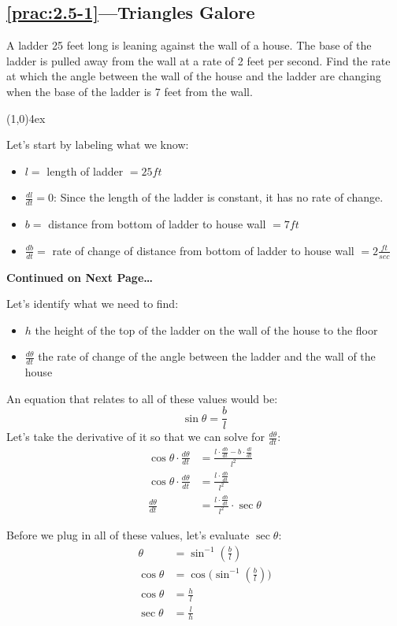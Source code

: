 \documentclass{MathNotes}
\newcommand{\continued}{
	\mbox{}
	\vfill
	\textbf{Continued on Next Page\ldots}\newpage
}
\newcommand{\br}{
	\begin{center}
		\line(1,0){4ex}
	\end{center}}
\begin{document}
\subsection*{\ref{prac:2.5-1}---Triangles Galore}\label{ans:2.5-1}
A ladder 25 feet long is leaning against the wall of a house. The base
of the ladder is pulled away from the wall at a rate of 2 feet per
second. Find the rate at which the angle between the wall of the house and the
ladder are changing when the base of the ladder is 7 feet from the wall.
\br
Let's start by labeling what we know:
\begin{multicols}{2}
	\begin{itemize}
		\item $l=$ length of ladder $=25ft$
		\item $\frac{dl}{dt}=0$: Since the length of the ladder is
		      constant, it has no rate of change.
		\item $b=$ distance from bottom of ladder to house wall $=7ft$
		\item $\frac{db}{dt}=$ rate of change of distance from bottom of ladder
		      to house wall $=2\frac{ft}{sec}$
	\end{itemize}
\end{multicols}
\continued
Let's identify what we need to find:
\begin{itemize}
	\item $h$ the height of the top of the ladder on the wall of the house
	      to the floor
	\item $\frac{d\theta}{dt}$ the rate of change of the angle between the
	      ladder and the wall of the house
\end{itemize}

An equation that relates to all of these values would be:
$$\sin\theta=\frac{b}{l}$$
Let's take the derivative of it so that we can solve for $\frac{d\theta}{dt}$:
\begin{align*}
	\cos\theta\cdot\frac{d\theta}{dt} & =\frac{l\cdot\frac{db}{dt}-b\cdot\frac{dl}{dt}}{l^2} \\
	\cos\theta\cdot\frac{d\theta}{dt} & =\frac{l\cdot\frac{db}{dt}}{l^2}                     \\
	\frac{d\theta}{dt}                & =\frac{l\cdot\frac{db}{dt}}{l^2}\cdot\sec\theta
\end{align*}

Before we plug in all of these values, let's evaluate $\sec\theta$:
\begin{align*}
	\theta     & =\sin^{-1}(\frac{b}{l})               \\
	\cos\theta & =\cos\big(\sin^{-1}(\frac{b}{l})\big) \\
	\cos\theta & =\frac{h}{l}                          \\
	\sec\theta & =\frac{l}{h}                          \\
\end{align*}
\end{document}
